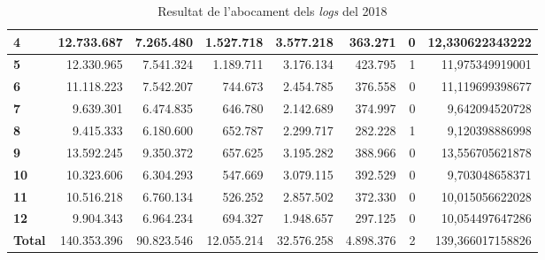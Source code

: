 \begin{table}[h!]
\begin{adjustbox}{width=1.2\textwidth, center}
\begin{tabular}{|l|r|r|r|r|r|r|r|}
            \textbf{4}     & 12.733.687  & 7.265.480  & 1.527.718  & 3.577.218  & 363.271   & 0 & 12,330622343222  \\
            \midrule
            \textbf{5}     & 12.330.965  & 7.541.324  & 1.189.711  & 3.176.134  & 423.795   & 1 & 11,975349919001  \\
            \textbf{6}     & 11.118.223  & 7.542.207  & 744.673    & 2.454.785  & 376.558   & 0 & 11,119699398677  \\
            \textbf{7}     & 9.639.301   & 6.474.835  & 646.780    & 2.142.689  & 374.997   & 0 & 9,642094520728   \\
            \textbf{8}     & 9.415.333   & 6.180.600  & 652.787    & 2.299.717  & 282.228   & 1 & 9,120398886998   \\
            \midrule
            \textbf{9}     & 13.592.245  & 9.350.372  & 657.625    & 3.195.282  & 388.966   & 0 & 13,556705621878  \\
            \textbf{10}    & 10.323.606  & 6.304.293  & 547.669    & 3.079.115  & 392.529   & 0 & 9,703048658371   \\
            \textbf{11}    & 10.516.218  & 6.760.134  & 526.252    & 2.857.502  & 372.330   & 0 & 10,015056622028  \\
            \textbf{12}    & 9.904.343   & 6.964.234  & 694.327    & 1.948.657  & 297.125   & 0 & 10,054497647286  \\
            \midrule
            \textbf{Total} & 140.353.396 & 90.823.546 & 12.055.214 & 32.576.258 & 4.898.376 & 2 & 139,366017158826 \\
            \bottomrule
        \end{tabular}
    \end{adjustbox}
    \caption{Resultat de l'abocament dels \textit{logs} del 2018}
    \label{tab:logs-table-2018}
\end{table}
